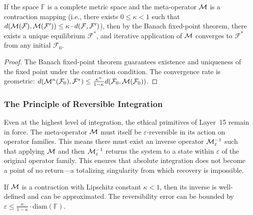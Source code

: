\begin{theorem}
\label{thm:fixed_point}
If the space $\mathbb{F}$ is a complete metric space and the meta-operator $\mathcal{M}$ is a contraction mapping (i.e., there exists $0 \le \kappa < 1$ such that $d(\mathcal{M}(\mathcal{F}), \mathcal{M}(\mathcal{F}')) \le \kappa \cdot d(\mathcal{F}, \mathcal{F}')$), then by the Banach fixed-point theorem, there exists a unique equilibrium $\mathcal{F}^*$, and iterative application of $\mathcal{M}$ converges to $\mathcal{F}^*$ from any initial $\mathcal{F}_0$.
\end{theorem}
\begin{proof}
The Banach fixed-point theorem guarantees existence and uniqueness of the fixed point under the contraction condition. The convergence rate is geometric: $d(\mathcal{M}^n(\mathcal{F}_0), \mathcal{F}^*) \le \frac{\kappa^n}{1-\kappa} d(\mathcal{F}_0, \mathcal{M}(\mathcal{F}_0))$.
\end{proof}

\subsubsection{The Principle of Reversible Integration}
Even at the highest level of integration, the ethical primitives of Layer~15 remain in force. The meta-operator $\mathcal{M}$ must itself be $\varepsilon$-reversible in its action on operator families. This means there must exist an inverse operator $\mathcal{M}^{-1}_\varepsilon$ such that applying $\mathcal{M}$ and then $\mathcal{M}^{-1}_\varepsilon$ returns the system to a state within $\varepsilon$ of the original operator family. This ensures that absolute integration does not become a point of no return—a totalizing singularity from which recovery is impossible.

\begin{proposition}
If $\mathcal{M}$ is a contraction with Lipschitz constant $\kappa < 1$, then its inverse is well-defined and can be approximated. The reversibility error can be bounded by $\varepsilon \le \frac{\kappa}{1-\kappa} \cdot \text{diam}(\mathbb{F})$.
\end{proposition}

